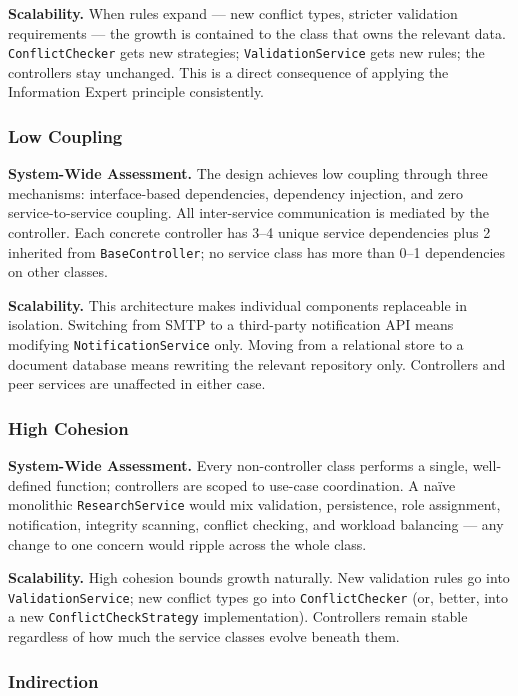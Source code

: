 \documentclass[12pt,a4paper]{article}
\newcommand{\code}[1]{\texttt{\small #1}}
\begin{document}
\noindent\textbf{Scalability.}
When rules expand --- new conflict types, stricter validation requirements --- the growth is contained to the class that owns the relevant data. \code{ConflictChecker} gets new strategies; \code{ValidationService} gets new rules; the controllers stay unchanged. This is a direct consequence of applying the Information Expert principle consistently.

\subsubsection{Low Coupling}

\noindent\textbf{System-Wide Assessment.}
The design achieves low coupling through three mechanisms: interface-based dependencies, dependency injection, and zero service-to-service coupling. All inter-service communication is mediated by the controller. Each concrete controller has 3--4 unique service dependencies plus 2 inherited from \code{BaseController}; no service class has more than 0--1 dependencies on other classes.

\noindent\textbf{Scalability.}
This architecture makes individual components replaceable in isolation. Switching from SMTP to a third-party notification API means modifying \code{NotificationService} only. Moving from a relational store to a document database means rewriting the relevant repository only. Controllers and peer services are unaffected in either case.

\subsubsection{High Cohesion}

\noindent\textbf{System-Wide Assessment.}
Every non-controller class performs a single, well-defined function; controllers are scoped to use-case coordination. A naïve monolithic \code{ResearchService} would mix validation, persistence, role assignment, notification, integrity scanning, conflict checking, and workload balancing --- any change to one concern would ripple across the whole class.

\noindent\textbf{Scalability.}
High cohesion bounds growth naturally. New validation rules go into \code{ValidationService}; new conflict types go into \code{ConflictChecker} (or, better, into a new \code{ConflictCheckStrategy} implementation). Controllers remain stable regardless of how much the service classes evolve beneath them.

\subsubsection{Indirection}
\end{document}
